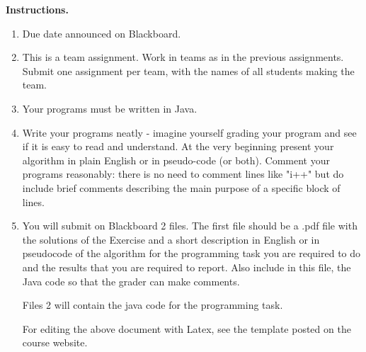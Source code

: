 \documentclass[11pt]{article}
\begin{document}
\vline

\textbf{Instructions.}
\begin{enumerate}
\item Due  date announced on Blackboard.



\item This is a team assignment. Work in teams as in the previous assignments.  Submit one assignment per team, with the names of all students making the team.


\item Your programs must be written in Java.

\item Write your programs neatly - imagine yourself grading your program and see if it is easy to read and understand. 
At the very beginning present your algorithm in plain English or in pseudo-code (or both).
Comment your programs reasonably: there is no need to comment lines like "i++" but do include brief comments describing the main purpose of a specific block of lines.

\item  You will submit on Blackboard 2 files. The first file should be a .pdf file  with the solutions of the Exercise  and a  short description in English or in pseudocode of the algorithm for the  programming task  you are required to do and the results that you are required to report. Also include in this file, the Java code so that the grader can make comments.

Files 2 will contain the java code  for the programming   task.






For editing the above document with  Latex, see the template posted on the course website. 
 

\end{enumerate}
\end{document}
